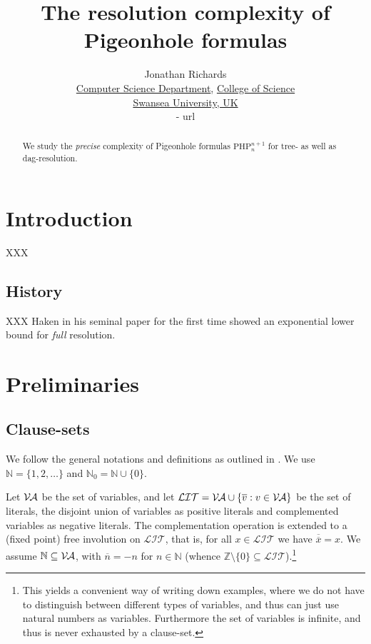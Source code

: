 \documentclass{report}
\newcommand{\set}[1]{\{ #1 \}}
\newcommand{\ol}{\overline}
\newcommand{\sm}{\setminus}
\newcommand{\sse}{\subseteq}
\newcommand{\mc}{\mathcal}
\newcommand{\ZZ}{\mathbb{Z}}
\newcommand{\NN}{\mathbb{N}}
\newcommand{\NNZ}{\NN_0}
\newcommand{\Va}{\mc{V\hspace{-0.1em}A}}
\newcommand{\Lit}{\mc{LIT}}
\newcommand{\php}{\mathrm{PHP}}
\begin{document}
\title{The resolution complexity of Pigeonhole formulas}

\author{
  Jonathan Richards\\
  \href{http://www.swan.ac.uk/compsci/}{Computer Science Department}, \href{http://www.swan.ac.uk/science/}{College of Science}\\
  \href{http://www.swan.ac.uk/}{Swansea University, UK}\\
  {- url}
}

\maketitle

\begin{abstract}
  We study the \emph{precise} complexity of Pigeonhole formulas $\php^{n+1}_n$ for tree- as well as dag-resolution.
\end{abstract}

\tableofcontents

\chapter{Introduction}
\label{cha:Introduction}

XXX

\section{History}
\label{sec:History}

XXX Haken in his seminal paper \cite{Haken1985Intractability} for the first time showed an exponential lower bound for \emph{full} resolution.



\chapter{Preliminaries}
\label{cha:Preliminaries}

\section{Clause-sets}
\label{clause-sets}

We follow the general notations and definitions as outlined in \cite{Kullmann2007HandbuchMU}. We use $\NN = \set{1,2,\dots}$ and $\NNZ = \NN \cup \set{0}$.

Let $\Va$ be the set of variables, and let $\Lit = \Va \cup \set{\ol{v} : v \in \Va}$ be the set of literals, the disjoint union of variables as positive literals and complemented variables as negative literals. The complementation operation is extended to a (fixed point) free involution on $\Lit$, that is, for all $x \in \Lit$ we have $\ol{\ol{x}} = x$. We assume $\NN \sse \Va$, with $\ol{n} = -n$ for $n \in \NN$ (whence $\ZZ \sm \set{0} \sse \Lit$).\footnote{This yields a convenient way of writing down examples, where we do not have to distinguish between different types of variables, and thus can just use natural numbers as variables. Furthermore the set of variables is infinite, and thus is never exhausted by a clause-set.}
\end{document}
